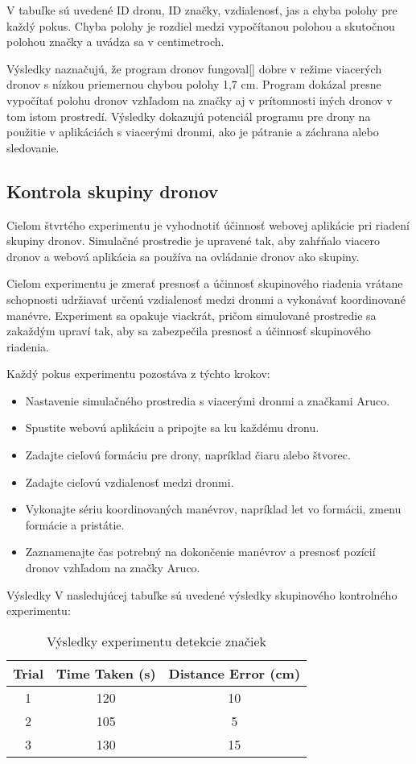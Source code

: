 V tabuľke sú uvedené ID dronu, ID značky, vzdialenosť, jas a chyba polohy pre každý pokus. Chyba polohy je rozdiel medzi vypočítanou polohou a skutočnou polohou značky a uvádza sa v centimetroch.

Výsledky naznačujú, že program dronov fungoval[] dobre v režime viacerých dronov s nízkou priemernou chybou polohy 1,7 cm. Program dokázal presne vypočítať polohu dronov vzhľadom na značky aj v prítomnosti iných dronov v tom istom prostredí. Výsledky dokazujú potenciál programu pre drony na použitie v aplikáciách s viacerými dronmi, ako je pátranie a záchrana alebo sledovanie.

\subsection{Kontrola skupiny dronov}
Cieľom štvrtého experimentu je vyhodnotiť účinnosť webovej aplikácie pri riadení skupiny dronov. Simulačné prostredie je upravené tak, aby zahŕňalo viacero dronov a webová aplikácia sa používa na ovládanie dronov ako skupiny.

Cieľom experimentu je zmerať presnosť a účinnosť skupinového riadenia vrátane schopnosti udržiavať určenú vzdialenosť medzi dronmi a vykonávať koordinované manévre. Experiment sa opakuje viackrát, pričom simulované prostredie sa zakaždým upraví tak, aby sa zabezpečila presnosť a účinnosť skupinového riadenia.

Každý pokus experimentu pozostáva z týchto krokov:

\begin{itemize}
    \item  Nastavenie simulačného prostredia s viacerými dronmi a značkami Aruco.
    \item  Spustite webovú aplikáciu a pripojte sa ku každému dronu.
    \item  Zadajte cieľovú formáciu pre drony, napríklad čiaru alebo štvorec.
    \item  Zadajte cieľovú vzdialenosť medzi dronmi.
    \item  Vykonajte sériu koordinovaných manévrov, napríklad let vo formácii, zmenu formácie a pristátie.
    \item  Zaznamenajte čas potrebný na dokončenie manévrov a presnosť pozícií dronov vzhľadom na značky Aruco.
\end{itemize}

Výsledky
V nasledujúcej tabuľke sú uvedené výsledky skupinového kontrolného experimentu:

\begin{table}[h!] 
    \centering
        \begin{tabular}{|c | c | c|} 
        \hline
        Trial & Time Taken (s) & Distance Error (cm) \\ [0.5ex] 
        \hline\hline
        1 & 120 & 10 \\ 
        \hline
        2 & 105 & 5 \\ 
        \hline
        3 & 130 & 15 \\ 
        \hline
       \end{tabular}
       \caption{Výsledky experimentu detekcie značiek}
        \label{table:1}
\end{table}

